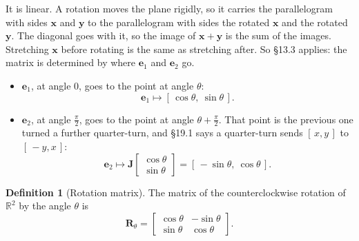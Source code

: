 \documentclass[11pt]{article}
\theoremstyle{plain}
\theoremstyle{definition}
\newtheorem{defn}{Definition}[section]
\theoremstyle{remark}
\newcommand{\R}{\mathbb{R}}
\newcommand{\vc}[1]{\mathbf{#1}}
\newcommand{\mt}[1]{\mathbf{#1}}
\begin{document}
\noindent It is linear. A rotation moves the plane rigidly, so it carries the
parallelogram with sides $\vc{x}$ and $\vc{y}$ to the parallelogram with sides
the rotated $\vc{x}$ and the rotated $\vc{y}$. The diagonal goes with it, so the
image of $\vc{x}+\vc{y}$ is the sum of the images. Stretching $\vc{x}$ before
rotating is the same as stretching after. So \S13.3 applies: the matrix is
determined by where $\vc{e}_1$ and $\vc{e}_2$ go.

\begin{itemize}[leftmargin=1.4em,itemsep=4pt]
  \item $\vc{e}_1$, at angle $0$, goes to the point at angle $\theta$:
        \[\vc{e}_1\longmapsto[\,\cos\theta,\ \sin\theta\,].\]
  \item $\vc{e}_2$, at angle $\frac{\pi}{2}$, goes to the point at angle
        $\theta+\frac{\pi}{2}$. That point is the previous one turned a further
        quarter-turn, and \S19.1 says a quarter-turn sends $[\,x,y\,]$ to
        $[\,-y,x\,]$:
        \[\vc{e}_2\longmapsto
          \mt{J}\begin{bmatrix}\cos\theta\\\sin\theta\end{bmatrix}
          =[\,-\sin\theta,\ \cos\theta\,].\]
\end{itemize}

\begin{defn}[Rotation matrix]
The matrix of the counterclockwise rotation of $\R^{2}$ by the angle $\theta$
is
\[
  \boxed{\;\mt{R}_\theta=\begin{bmatrix}\cos\theta&-\sin\theta\\
                                       \sin\theta&\cos\theta\end{bmatrix}.\;}
\]
\end{defn}

\begin{center}
\end{center}
\end{document}
